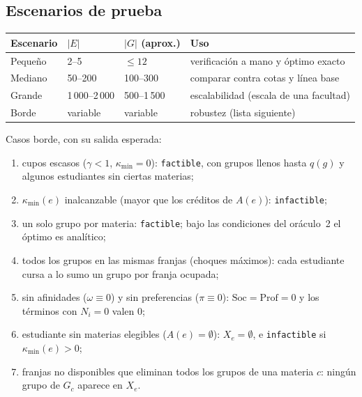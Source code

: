 \documentclass[11pt,letterpaper]{article}
\theoremstyle{definition}
\theoremstyle{remark}
\theoremstyle{plain}
\newcommand{\card}[1]{\lvert #1 \rvert}
\begin{document}
\subsection{Escenarios de prueba}
\begin{center}
\small
\begin{tabular}{llll}
\toprule
Escenario & $\card{E}$ & $\card{G}$ (aprox.) & Uso \\
\midrule
Pequeño & 2--5 & $\le 12$ & verificación a mano y óptimo exacto \\
Mediano & 50--200 & 100--300 & comparar contra cotas y línea base \\
Grande & 1\,000--2\,000 & 500--1\,500 & escalabilidad (escala de una facultad) \\
Borde & variable & variable & robustez (lista siguiente) \\
\bottomrule
\end{tabular}
\end{center}
Casos borde, con su salida esperada:
\begin{enumerate}[label=(\roman*),nosep]
  \item cupos escasos ($\gamma<1$, $\kappa_{\min}=0$): \texttt{factible}, con
        grupos llenos hasta $q(g)$ y algunos estudiantes sin ciertas materias;
  \item $\kappa_{\min}(e)$ inalcanzable (mayor que los créditos de $A(e)$):
        \texttt{infactible};
  \item un solo grupo por materia: \texttt{factible}; bajo las condiciones del
        oráculo~2 el óptimo es analítico;
  \item todos los grupos en las mismas franjas (choques máximos): cada
        estudiante cursa a lo sumo un grupo por franja ocupada;
  \item sin afinidades ($\omega\equiv0$) y sin preferencias ($\pi\equiv0$):
        $\mathrm{Soc}=\mathrm{Prof}=0$ y los términos con $N_i=0$ valen $0$;
  \item estudiante sin materias elegibles ($A(e)=\emptyset$): $X_e=\emptyset$,
        e \texttt{infactible} si $\kappa_{\min}(e)>0$;
  \item franjas no disponibles que eliminan todos los grupos de una materia
        $c$: ningún grupo de $G_c$ aparece en $X_e$.
\end{enumerate}
\end{document}
